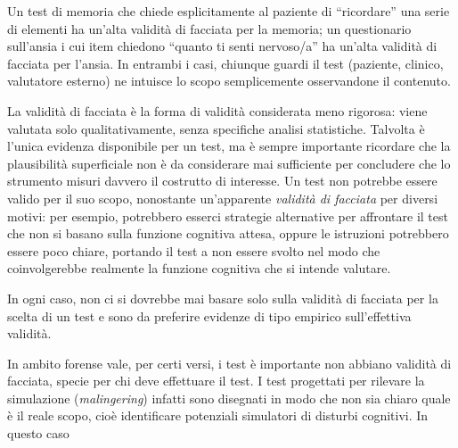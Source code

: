 \documentclass[
  italian,
  letterpaper,
  paper=6in:9in,
  pagesize=pdftex,
  headinclude=on,
  footinclude=on,
  11pt]{scrbook}
\begin{document}
Un test di memoria che chiede esplicitamente al paziente di
``ricordare'' una serie di elementi ha un'alta validità di facciata per
la memoria; un questionario sull'ansia i cui item chiedono ``quanto ti
senti nervoso/a'' ha un'alta validità di facciata per l'ansia. In
entrambi i casi, chiunque guardi il test (paziente, clinico, valutatore
esterno) ne intuisce lo scopo semplicemente osservandone il contenuto.

La validità di facciata è la forma di validità considerata meno
rigorosa: viene valutata solo qualitativamente, senza specifiche analisi
statistiche. Talvolta è l'unica evidenza disponibile per un test, ma è
sempre importante ricordare che la plausibilità superficiale non è da
considerare mai sufficiente per concludere che lo strumento misuri
davvero il costrutto di interesse. Un test non potrebbe essere valido
per il suo scopo, nonostante un'apparente \emph{validità di facciata}
per diversi motivi: per esempio, potrebbero esserci strategie
alternative per affrontare il test che non si basano sulla funzione
cognitiva attesa, oppure le istruzioni potrebbero essere poco chiare,
portando il test a non essere svolto nel modo che coinvolgerebbe
realmente la funzione cognitiva che si intende valutare.

In ogni caso, non ci si dovrebbe mai basare solo sulla validità di
facciata per la scelta di un test e sono da preferire evidenze di tipo
empirico sull'effettiva validità.

\begin{tcolorbox}[enhanced jigsaw, title=\textcolor{quarto-callout-tip-color}{\faLightbulb}\hspace{0.5em}{Validità di facciata in ambito forense}, coltitle=black, bottomtitle=1mm, colback=white, bottomrule=.15mm, rightrule=.15mm, breakable, toptitle=1mm, left=2mm, colbacktitle=quarto-callout-tip-color!10!white, titlerule=0mm, colframe=quarto-callout-tip-color-frame, leftrule=.75mm, opacitybacktitle=0.6, arc=.35mm, toprule=.15mm, opacityback=0]

In ambito forense vale, per certi versi, i test è importante non abbiano
validità di facciata, specie per chi deve effettuare il test. I test
progettati per rilevare la simulazione (\emph{malingering}) infatti sono
disegnati in modo che non sia chiaro quale è il reale scopo, cioè
identificare potenziali simulatori di disturbi cognitivi. In questo caso

\end{tcolorbox}

{\vspace{1cm}}
\end{document}
